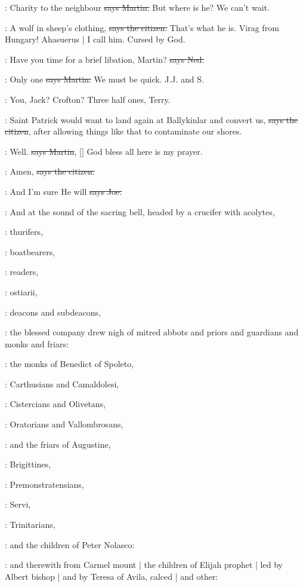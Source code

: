 \cunningham:
Charity to the neighbour
\sout{says Martin.}
But where is he?
We can't wait.

\citizen:
A wolf in sheep's clothing,
\sout{says the citizen.}
That's what he is.
Virag from Hungary!
Ahasuerus |
I call him.
Cursed by God.

\lambert:
Have you time for a brief libation,
Martin?
\sout{says Ned.}

\cunningham:
Only one
\sout{says Martin.}
We must be quick.
J.J. and S.

\lambert:
You,
Jack?
Crofton?
Three half ones,
Terry.

\citizen:
Saint Patrick would want to land again
at Ballykinlar and convert us,
\sout{says the citizen},
after allowing things like that to contaminate our shores.

\cunningham:
Well.
\sout{says Martin},
[]
God bless all here is my prayer.

\citizen:
Amen,
\sout{says the citizen.}

\joe:
And I'm sure He will
\sout{says Joe.}

:
And at the sound of the sacring bell,
headed by a crucifer with acolytes,

:
thurifers,

:
boatbearers,

:
readers,

:
ostiarii,

:
deacons and subdeacons,

:
the blessed company drew nigh
of mitred abbots
and priors
and guardians
and monks
and friars:

:
the monks of Benedict of Spoleto,

:
Carthusians and Camaldolesi,

:
Cistercians and Olivetans,

:
Oratorians and Vallombrosans,

:
and the friars of Augustine,

:
Brigittines,

:
Premonstratensians,

:
Servi,

:
Trinitarians,

:
and the children of Peter Nolasco:

:
and therewith from Carmel mount |
the children of Elijah prophet |
led by Albert bishop |
and by Teresa of Avila,
calced |
and other:

